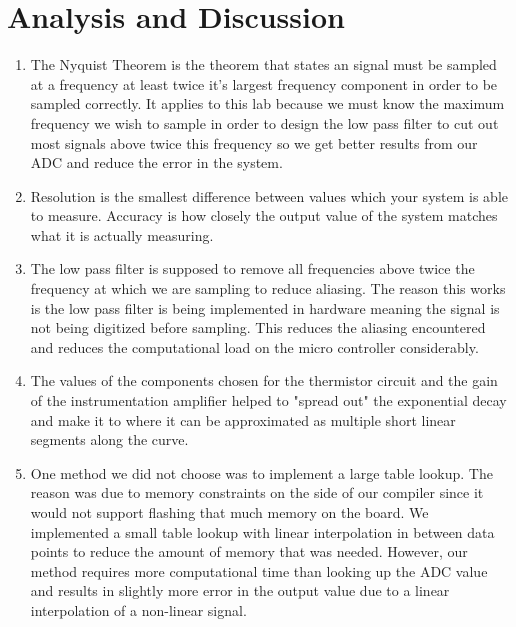 \documentclass{article}
\begin{document}
\section{Analysis and Discussion}
	\begin{enumerate}
		\item%
			The Nyquist Theorem is the theorem that states an signal must be sampled at a frequency at least twice it's largest frequency component in order to be sampled correctly. It applies to this lab because we must know the maximum frequency we wish to sample in order to design the low pass filter to cut out most signals above twice this frequency so we get better results from our ADC and reduce the error in the system.
		\item%
			Resolution is the smallest difference between values which your system is able to measure. Accuracy is how closely the output value of the system matches what it is actually measuring.
		\item%
			The low pass filter is supposed to remove all frequencies above twice the frequency at which we are sampling to reduce aliasing. The reason this works is the low pass filter is being implemented in hardware meaning the signal is not being digitized before sampling. This reduces the aliasing encountered and reduces the computational load on the micro controller considerably.
		\item%
			The values of the components chosen for the thermistor circuit and the gain of the instrumentation amplifier helped to "spread out" the exponential decay and make it to where it can be approximated as multiple short linear segments along the curve.
		\item%
			One method we did not choose was to implement a large table lookup. The reason was due to memory constraints on the side of our compiler since it would not support flashing that much memory on the board. We implemented a small table lookup with linear interpolation in between data points to reduce the amount of memory that was needed. However, our method requires more computational time than looking up the ADC value and results in slightly more error in the output value due to a linear interpolation of a non-linear signal.
	\end{enumerate}
\end{document}
